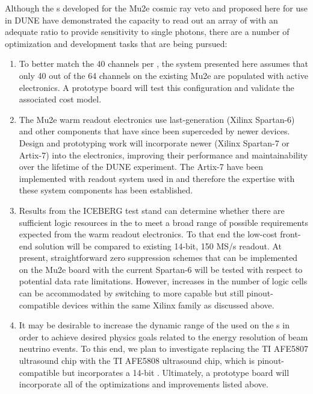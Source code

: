 
Although the s developed for the Mu2e cosmic ray veto and proposed here for use in DUNE have
demonstrated the capacity to read out an array of  with an adequate  ratio to provide sensitivity to single photons, there are a number of optimization and development tasks that are being pursued:  
\begin{enumerate}
\item To better match the 40  channels per , the system presented here assumes that only 40 out of the 64 channels on the existing Mu2e  are populated with active electronics.  A prototype board will test this configuration and validate the associated cost model.  
\item The Mu2e warm readout electronics use last-generation (Xilinx\texttrademark{} Spartan-6)  and other components that have since been superceded by newer devices.  Design and prototyping work will 
incorporate newer  (Xilinx Spartan-7 or Artix-7) into the electronics,
improving their performance and maintainability over the lifetime of the DUNE experiment. The Artix-7  have been implemented with  readout system used in  and therefore the expertise with these system components has been established. 
\item Results from the ICEBERG test stand can determine whether there are sufficient logic resources in the  to meet a broad range of possible  requirements expected from the warm readout electronics. To that end the low-cost front-end solution will be compared to existing 14-bit, 150 MS/s  readout. At present, straightforward zero suppression schemes that can be implemented on the Mu2e board with the current Spartan-6  will be tested with respect to potential  data rate limitations.  However, increases in the number of logic cells can be accommodated by switching to more capable but still pinout-compatible devices within the same Xilinx  family as discussed above.  
\item It may be desirable to increase the dynamic range of the  used on the s in order to achieve desired physics goals related to the energy resolution of beam neutrino events.  To this end, %
we plan to investigate replacing the TI AFE5807 ultrasound chip with the TI AFE5808 ultrasound chip, which is pinout-compatible but incorporates a 14-bit .  Ultimately, a prototype board will %
incorporate all of the optimizations and improvements listed above.
\end{enumerate}
